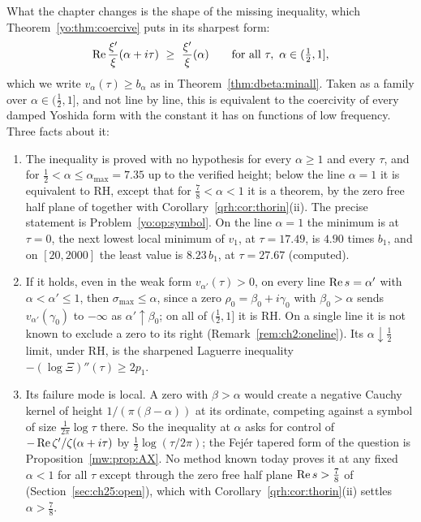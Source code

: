 What the chapter changes is the shape of the missing inequality, which Theorem~\ref{yo:thm:coercive} puts in its sharpest form:
\begin{equation}\label{yo:eq:target}
\re\frac{\xi'}{\xi}(\alpha+i\tau)\ \ge\ \frac{\xi'}{\xi}(\alpha)\qquad\text{for all }\tau,\ \alpha\in(\tfrac12,1],
\end{equation}
which we write $v_\alpha(\tau)\ge b_\alpha$ as in Theorem~\ref{thm:dbeta:minall}. Taken as a family over $\alpha\in(\frac12,1]$, and not line by line, this is equivalent to the coercivity of every damped Yoshida form with the constant it has on functions of low frequency. Three facts about it:
\begin{enumerate}
\item The inequality is proved with no hypothesis for every $\alpha\ge1$ and every $\tau$, and for $\frac12<\alpha\le\alpha_{\max}=7.35$ up to the verified height; below the line $\alpha=1$ it is equivalent to RH, except that for $\frac78<\alpha<1$ it is a theorem, by the zero free half plane of \cite{OAI26a} together with Corollary~\ref{qrh:cor:thorin}(ii). The precise statement is Problem~\ref{yo:op:symbol}. On the line $\alpha=1$ the minimum is at $\tau=0$, the next lowest local minimum of $v_1$, at $\tau=17.49$, is $4.90$ times $b_1$, and on $[20,2000]$ the least value is $8.23\,b_1$, at $\tau=27.67$ (computed).
\item If it holds, even in the weak form $v_{\alpha'}(\tau)>0$, on every line $\operatorname{Re} s=\alpha'$ with $\alpha<\alpha'\le1$, then $\sigma_{\max}\le\alpha$, since a zero $\rho_0=\beta_0+i\gamma_0$ with $\beta_0>\alpha$ sends $v_{\alpha'}(\gamma_0)$ to $-\infty$ as $\alpha'\uparrow\beta_0$; on all of $(\frac12,1]$ it is RH. On a single line it is not known to exclude a zero to its right (Remark~\ref{rem:ch2:oneline}). Its $\alpha\downarrow\frac12$ limit, under RH, is the sharpened Laguerre inequality $-(\log\Xi)''(\tau)\ge2p_1$.
\item Its failure mode is local. A zero with $\beta>\alpha$ would create a negative Cauchy kernel of height $1/(\pi(\beta-\alpha))$ at its ordinate, competing against a symbol of size $\frac1{2\pi}\log\tau$ there. So the inequality at $\alpha$ asks for control of $-\operatorname{Re}\zeta'/\zeta(\alpha+i\tau)$ by $\frac12\log(\tau/2\pi)$; the Fej\'er tapered form of the question is Proposition~\ref{mw:prop:AX}. No method known today proves it at any fixed $\alpha<1$ for all $\tau$ except through the zero free half plane $\operatorname{Re} s>\frac78$ of \cite{OAI26a} (Section~\ref{sec:ch25:open}), which with Corollary~\ref{qrh:cor:thorin}(ii) settles $\alpha>\frac78$.
\end{enumerate}

